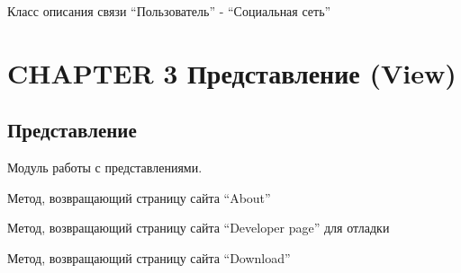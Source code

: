 \documentclass[letterpaper,10pt,english]{sphinxmanual}
\begin{document}

\begin{fulllineitems}
\label{models:mainServer.models.UserSocialNetwork}
Класс описания связи ``Пользователь'' - ``Социальная сеть''

\end{fulllineitems}



\chapter{CHAPTER 3 Представление (View)}
\label{view:chapter-3-view}\label{view::doc}

\section{Представление}
\label{view:id1}\label{view:module-mainServer.views}
Модуль работы с представлениями.

\begin{fulllineitems}
\label{view:mainServer.views.aboutPage}
Метод, возвращающий страницу сайта ``About''

\end{fulllineitems}


\begin{fulllineitems}
\label{view:mainServer.views.devPage}
Метод, возвращающий страницу сайта ``Developer page'' для отладки

\end{fulllineitems}


\begin{fulllineitems}
\label{view:mainServer.views.downloadPage}
Метод, возвращающий страницу сайта ``Download''

\end{fulllineitems}
\end{document}
